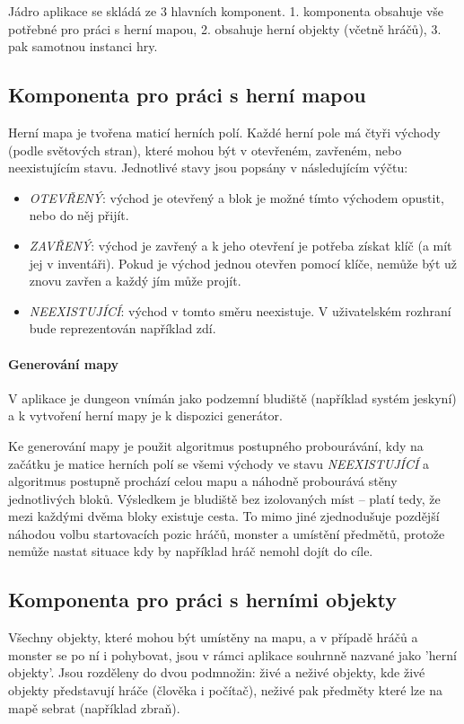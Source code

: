 \documentclass[11pt,a4paper]{scrartcl}
\begin{document}
	Jádro aplikace se skládá ze 3 hlavních komponent. 1. komponenta obsahuje vše potřebné pro práci s herní mapou, 2. obsahuje herní objekty (včetně hráčů), 3. pak samotnou instanci hry.
	
	\subsection{Komponenta pro práci s herní mapou}
	Herní mapa je tvořena maticí herních polí. Každé herní pole má čtyři východy (podle světových stran), které mohou být v otevřeném, zavřeném, nebo neexistujícím stavu. Jednotlivé stavy jsou popsány v následujícím výčtu:
	
	\begin{itemize}
		\item \textit{OTEVŘENÝ}: východ je otevřený a blok je možné tímto východem opustit, nebo do něj přijít.
		
		\item \textit{ZAVŘENÝ}: východ je zavřený a k jeho otevření je potřeba získat klíč (a mít jej v inventáři). Pokud je východ jednou otevřen pomocí klíče, nemůže být už znovu zavřen a každý jím může projít.
		
		\item \textit{NEEXISTUJÍCÍ}: východ v tomto směru neexistuje. V uživatelském rozhraní bude reprezentován například zdí.
	\end{itemize}
	
	\paragraph{Generování mapy}
	V aplikace je dungeon vnímán jako podzemní bludiště (například systém jeskyní) a k vytvoření herní mapy je k dispozici generátor. 
	
	Ke generování mapy je použit algoritmus postupného probourávání, kdy na začátku je matice herních polí se všemi východy ve stavu \textit{NEEXISTUJÍCÍ} a algoritmus postupně prochází celou mapu a náhodně probourává stěny jednotlivých bloků. Výsledkem je bludiště bez izolovaných míst -- platí tedy, že mezi každými dvěma bloky existuje cesta. To mimo jiné zjednodušuje pozdější náhodou volbu startovacích pozic hráčů, monster a umístění předmětů, protože nemůže nastat situace kdy by například hráč nemohl dojít do cíle.
	
	\subsection{Komponenta pro práci s herními objekty}
	Všechny objekty, které mohou být umístěny na mapu, a v případě hráčů a monster se po ní i pohybovat, jsou v rámci aplikace souhrnně nazvané jako 'herní objekty'. Jsou rozděleny do dvou podmnožin: živé a neživé objekty, kde živé objekty představují hráče (člověka i počítač), neživé pak předměty které lze na mapě sebrat (například zbraň).
	
\end{document}
